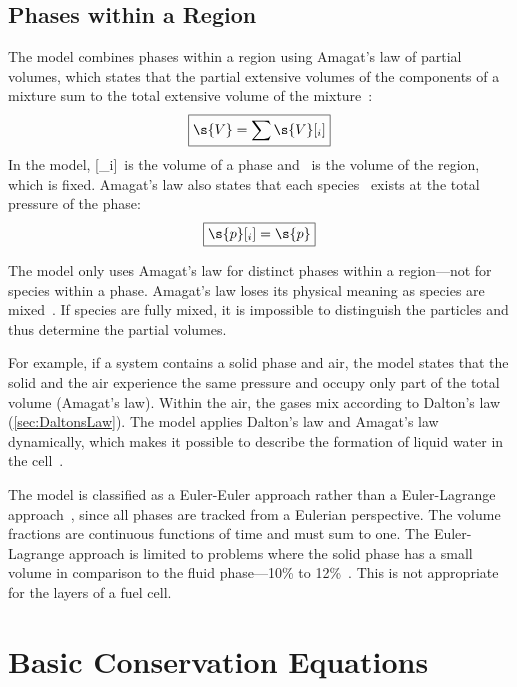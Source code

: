 \subsection{Phases within a Region}
\label{sec:AmagatsLaw}

The model combines phases within a region using Amagat's law of partial volumes, which states that the partial extensive volumes of the components of a mixture sum to the total extensive volume of the mixture~\cite{Bejan2006}:%
\begin{equation}
  \boxed{\s{V} = \sum\s{V}[_i]}
\end{equation}
In the model, [_i]~is the volume of a phase and ~is the volume of the region, which is fixed.  Amagat's law also states that each species~ exists at the total pressure of the phase:
\begin{equation}
  \boxed{\s{p}[_i] = \s{p}}
\end{equation}

The model only uses Amagat's law for distinct phases within a region---not for species within a phase.  Amagat's law loses its physical meaning as species are mixed~\cite{Woo1995}.  If species are fully mixed, it is impossible to distinguish the particles and thus determine the partial volumes.

For example, if a system contains a solid phase and air, the model states that the solid and the air experience the same pressure and occupy only part of the total volume (Amagat's law).  Within the air, the gases mix according to Dalton's law (\autoref{sec:DaltonsLaw}).  The model applies Dalton's law and Amagat's law dynamically, which makes it possible to describe the formation of liquid water in the cell~\cite{Bevers1997, Li2005, Weber2004ChemRev}.

The model is classified as a Euler-Euler approach rather than a Euler-Lagrange approach~\cite{Fluent6.3}, since all phases are tracked from a Eulerian perspective.  The volume fractions are continuous functions of time and must sum to one.  The Euler-Lagrange approach is limited to problems where the solid phase has a small volume in comparison to the fluid phase---10\% to 12\%~\cite{Fluent6.3}.  This is not appropriate for the layers of a fuel cell.


\section{Basic Conservation Equations}
\label{sec:BasicConservation}

